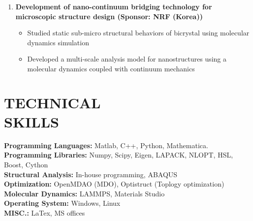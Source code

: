\documentclass[margin, 10pt]{res} %
\begin{document}
\begin{resume}
\begin{enumerate}
    \item \textbf{Development of nano-continuum bridging technology for microscopic structure design (Sponsor: NRF (Korea))}
    \begin{itemize}
        \item Studied static sub-micro structural behaviors of bicrystal using molecular dynamics simulation
        \item Developed a multi-scale analysis model for nanostructures using a molecular dynamics coupled with continuum mechanics 
        
    \end{itemize}
    
\end{enumerate}


\section{TECHNICAL \\ SKILLS} 

\textbf{Programming Languages:} Matlab, C++, Python, Mathematica. \\
\textbf{Programming Libraries:} Numpy, Scipy, Eigen, LAPACK, NLOPT, HSL, Boost, Cython \\
\textbf{ Structural Analysis:} In-house programming, ABAQUS \\
\textbf{ Optimization:} OpenMDAO (MDO), Optistruct (Toplogy optimization) \\
\textbf{ Molecular Dynamics:} LAMMPS, Materials Studio \\
\textbf{ Operating System:} Windows, Linux \\
\textbf{ MISC.:} LaTex, MS offices \\
 

 

\end{resume}
\end{document}
